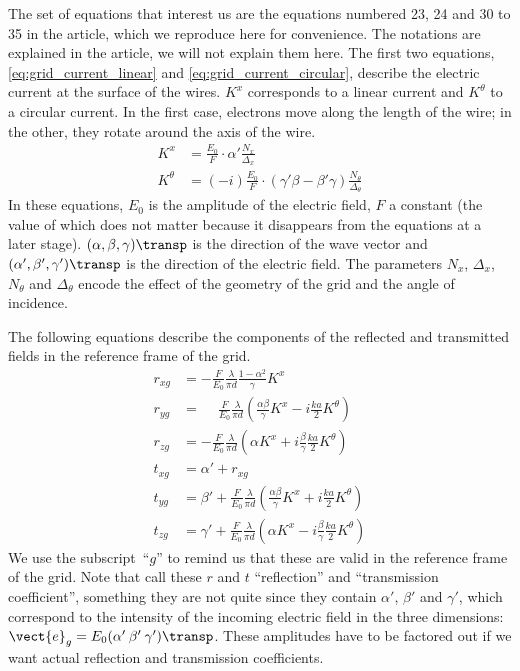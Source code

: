 \begin{refsection}
The set of equations that interest us are the equations numbered 23, 24 and 30 to 35 in the article, which we reproduce here for convenience.
The notations are explained in the article, we will not explain them here.
The first two equations, \eqref{eq:grid_current_linear} and \eqref{eq:grid_current_circular}, describe the electric current at the surface of the wires.
$K^x$ corresponds to a linear current and $K^\theta$ to a circular current.
In the first case, electrons move along the length of the wire; in the other, they rotate around the axis of the wire.
\begin{align}
    K^x &= \frac{E_0}{F} \cdot \alpha' \frac{N_x}{\Delta_x}
    \label{eq:grid_current_linear}
    \\
    K^\theta &= (-i) \frac{E_0}{F} \cdot (\gamma' \beta - \beta' \gamma) \frac{N_\theta}{\Delta_\theta}
    \label{eq:grid_current_circular}
\end{align}
In these equations, $E_0$ is the amplitude of the electric field, $F$ a constant (the value of which does not matter because it disappears from the equations at a later stage).
$(\alpha, \beta, \gamma)\transp$ is the direction of the wave vector and
$(\alpha', \beta', \gamma')\transp$ is the direction of the electric field.
The parameters $N_x$, $\Delta_x$, $N_\theta$ and $\Delta_\theta$ encode the effect of the geometry of the grid and the angle of incidence.

The following equations describe the components of the reflected and transmitted fields in the reference frame of the grid.
\begin{align}
    r_{xg}
    &=
    -\frac{F}{E_0}
    \frac{\lambda}{\pi d}
    \frac{1 - \alpha^2}{\gamma} K^x
    \label{eq:houde_Rx}
    \\
    r_{yg}
    &=
    \phantom{-}
    \frac{F}{E_0}
    \frac{\lambda}{\pi d}
    \left(
        \frac{\alpha \beta}{\gamma} K^x
        -
        i \frac{ka}{2} K^\theta
    \right)
    \\
    r_{zg}
    &=
    -\frac{F}{E_0}
    \frac{\lambda}{\pi d}
    \left(
       \alpha K^x
       +
       i \frac{\beta}{\gamma} \frac{ka}{2} K^\theta
    \right)
    \\
    t_{xg} &= \alpha' + r_{xg}
    \\
    t_{yg}
    &=
    \beta' +
    \frac{F}{E_0}
    \frac{\lambda}{\pi d}
    \left(
        \frac{\alpha \beta}{\gamma} K^x + i \frac{ka}{2} K^\theta
    \right)
    \\
    t_{zg}
    &=
    \gamma' +
    \frac{F}{E_0}
    \frac{\lambda}{\pi d}
    \left(
        \alpha K^x - i \frac{\beta}{\gamma} \frac{ka}{2} K^\theta
    \right)
\end{align}
We use the subscript~``$g$'' to remind us that these are valid in the reference frame of the grid.
Note that \citeauthor{houde_2001} call these $r$ and $t$ ``reflection'' and ``transmission coefficient'', something they are not quite since they contain $\alpha'$, $\beta'$ and $\gamma'$, which correspond to the intensity of the incoming electric field in the three dimensions: $\vect{e}_g=E_0 (\alpha' \: \beta' \: \gamma')\transp$.
These amplitudes have to be factored out if we want actual reflection and transmission coefficients.


\end{refsection}
